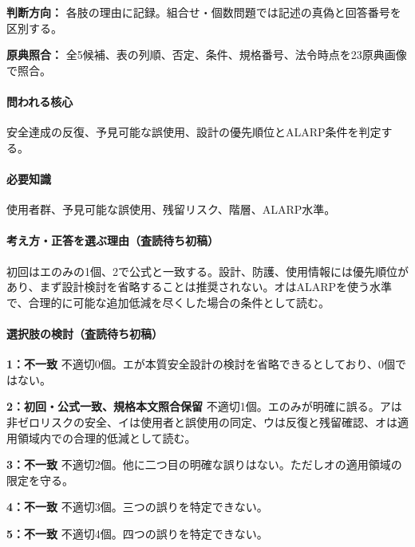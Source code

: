 \noindent\textbf{判断方向：} 各肢の理由に記録。組合せ・個数問題では記述の真偽と回答番号を区別する。\par

\noindent\textbf{原典照合：} 全5候補、表の列順、否定、条件、規格番号、法令時点を23原典画像で照合。\par

\paragraph{問われる核心} 安全達成の反復、予見可能な誤使用、設計の優先順位とALARP条件を判定する。

\paragraph{必要知識} 使用者群、予見可能な誤使用、残留リスク、階層、ALARP水準。

\paragraph{考え方・正答を選ぶ理由（査読待ち初稿）} 初回はエのみの1個、2で公式と一致する。設計、防護、使用情報には優先順位があり、まず設計検討を省略することは推奨されない。オはALARPを使う水準で、合理的に可能な追加低減を尽くした場合の条件として読む。

\paragraph{選択肢の検討（査読待ち初稿）}\mbox{}\par

\noindent\textbf{1：不一致} 不適切0個。エが本質安全設計の検討を省略できるとしており、0個ではない。\par

\noindent\textbf{2：初回・公式一致、規格本文照合保留} 不適切1個。エのみが明確に誤る。アは非ゼロリスクの安全、イは使用者と誤使用の同定、ウは反復と残留確認、オは適用領域内での合理的低減として読む。\par

\noindent\textbf{3：不一致} 不適切2個。他に二つ目の明確な誤りはない。ただしオの適用領域の限定を守る。\par

\noindent\textbf{4：不一致} 不適切3個。三つの誤りを特定できない。\par

\noindent\textbf{5：不一致} 不適切4個。四つの誤りを特定できない。\par

